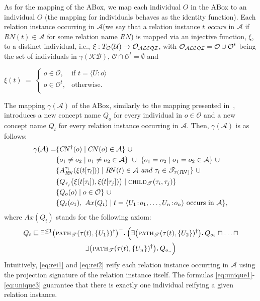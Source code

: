 \documentclass[envcountsame,draft]{llncs}
\newcommand{\KB}{\ensuremath{\mathcal{KB}}\xspace}
\newcommand{\per}{\mathpunct{\mbox{\bf .}}}
\newcommand{\pth}[2]{\ensuremath{\textsc{path}_{\mathscr{T}}(#1,#2)}\xspace}
\newcommand{\chd}[2]{\ensuremath{\textsc{child}_{\mathscr{T}}(#1,#2)}\xspace}
\newcommand{\A}{\ensuremath{\mathcal{A}}\xspace}
\newcommand{\Ob}{\ensuremath{\mathcal{O}}\xspace}
\begin{document}
As for the mapping of the ABox, we map each individual $O$ in the
\DLRpm ABox to an \ALCQI individual $O$ (the mapping for
individuals behaves as the identity function).
%
Each relation instance occurring in \A (we say that a relation
instance $t$ \emph{occurs} in \A if $R\!N(t)\in\A$ for some relation
name $R\!N$) is mapped via an injective function, $\xi$, to a distinct
individual, i.e., $\xi: T_\Ob(\mathcal{U})\to \mathcal{O}_\ALCQI$,
with $\mathcal{O}_\ALCQI = \Ob\cup \Ob^t$ being the set of individuals
in $\gamma(\KB)$, $\Ob \cap \Ob^t = \emptyset$ and

$\xi(t)  ~=~ %
                  \begin{cases}
                    o\in\Ob, &\text{if } t = \langle U\!:\!o\rangle \\
                    o\in\Ob^t, &\text{otherwise.}\\
                  \end{cases}
$

\noindent The mapping $\gamma(\A)$ of the ABox, similarly to the
mapping presented in~\cite{HorrocksSTT00}, introduces a new concept
name $Q_o$ for every individual in $o \in\Ob$ and a new concept name
$Q_t$ for every relation instance occurring in \A. Then, $\gamma(\A)$
is as follows:
%
\begin{align}
\gamma(\A) =
& \label{eq:ob1}
\{ C\!N^\dag(o) \mid C\!N(o)\in\A \} ~\cup\\
& \label{eq:ob2}
\{ o_1\neq o_2 \mid o_1\neq o_2\in\A \} ~\cup~\{ o_1=o_2 \mid o_1= o_2\in\A \}~\cup\\
& \label{eq:rei1}
\{A^{\tau_i}_{R\!N}(\xi(t[\tau_i])) \mid R\!N(t)\in\A \textit{ and } \tau_i
  \in\mathscr{T}_{\tau(R\!N)}\} ~\cup\\
& \label{eq:rei2}
\{ Q_{\tau_j}\big(\xi(t[\tau_i]),\xi(t[\tau_j])\big) \mid
  \chd{\tau_i}{\tau_j} \}\\
& \label{eq:unique1}
\{Q_o(o)\mid o\in\Ob\}~\cup\\
& \label{eq:unique2}
\{Q_t(o_1),~Ax(Q_t)\mid t = \langle
  U_1\!:\!o_1,\ldots, U_n\!:\!o_n\rangle \text{ occurs in } \A\},
\end{align}
%
where $Ax(Q_t)$ stands for the following axiom:
%
\begin{multline}
  \label{eq:unique3}
  Q_t\sqsubseteq \exists^{\leq 1}\big(\pth{\tau(t)}{\{U_1\}}^\dag
  \big)^-\per\Big(\exists \big(\pth{\tau(t)}{\{U_2\}}^\dag
  \big)\per Q_{o_2}\sqcap\ldots\sqcap\\
  \exists \big(\pth{\tau(t)}{\{U_n\}}^\dag
  \big)\per Q_{o_n}\Big)
\end{multline}
%
Intuitively, \eqref{eq:rei1} and \eqref{eq:rei2} reify each relation
instance occurring in \A using the projection signature of the
relation instance itself. The formulas \eqref{eq:unique1}-\eqref{eq:unique3} guarantee that there is exactly one \ALCQI
individual reifying a given relation instance.
\end{document}
